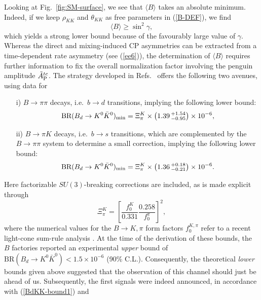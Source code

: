 \documentclass[11pt]{cernrep}
\begin{document}
Looking at Fig.~\ref{fig:SM-surface}, we see that $\langle B \rangle$ takes
an absolute minimum. Indeed, if we keep $\rho_{K\!K}$ and $\theta_{K\!K}$
as free parameters in (\ref{B-DEF}), we find
\begin{equation}\label{B-bound}
\langle B \rangle\geq \sin^2\gamma,
\end{equation}
which yields a strong lower bound because of the favourably large value of
$\gamma$. Whereas the direct and mixing-induced CP asymmetries can
be extracted from a time-dependent rate asymmetry (see (\ref{ee6})), 
the determination of $\langle B \rangle$ requires further information to
fix the overall normalization factor involving the penguin amplitude
$\tilde A_{\rm P}^{tc}$. The strategy developed in Refs.~\cite{BFRS2,BFRS3} offers the 
following two avenues, using data for
\begin{itemize}
\item[i)] $B\to\pi\pi$ decays, i.e.\ $b\to d$ transitions, implying the following
lower bound:
\begin{equation}\label{BdKK-bound1}
\mbox{BR}(B_d\to K^0\bar K^0)_{\rm min}= 
\Xi^K_\pi\times\left(1.39\,^{+1.54}_{-0.95}\right) \times 10^{-6},
\end{equation}
\item[ii)] $B\to\pi K$ decays, i.e.\ $b\to s$ transitions, which are complemented 
by the $B\to\pi\pi$ system to determine a small correction, implying the following
lower bound:
\begin{equation}\label{BdKK-bound2}
\mbox{BR}(B_d\to K^0\bar K^0)_{\rm min}= 
\Xi^K_\pi\times\left(1.36\,^{+0.18}_{-0.21}\right) \times 10^{-6}.
\end{equation}
\end{itemize}
Here factorizable $SU(3)$-breaking corrections are included, 
as is made explicit through
\begin{equation}\label{Xi-K-pi}
\Xi^K_\pi=\left[\frac{f_0^K}{0.331}\frac{0.258}{f_0^\pi}\right]^2,
\end{equation}
where the numerical values for the $B\to K,\pi$ form factors $f_0^{K,\pi}$ 
refer to a recent light-cone sum-rule analysis \cite{Ball}. At the time of the 
derivation of these bounds, the $B$ factories reported an experimental {\it upper} 
bound of $\mbox{BR}(B_d\to K^0\bar K^0)<1.5\times 10^{-6}$ (90\% C.L.). Consequently, the theoretical {\it lower} bounds given above suggested that
the observation of this channel should just be ahead of us. Subsequently, the
first signals were indeed announced, in accordance with (\ref{BdKK-bound1}) and 
\end{document}
